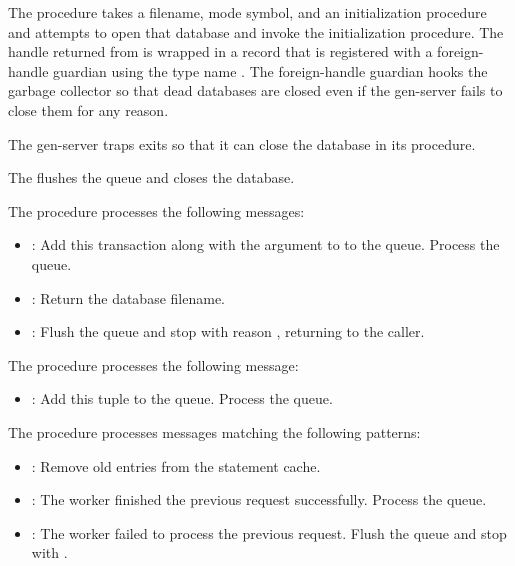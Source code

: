  The  procedure takes a filename, mode
symbol, and an initialization procedure and attempts to open that
database and invoke the initialization procedure.  The handle returned
from  is wrapped in a  record
that is registered with a foreign-handle guardian using the type name
.  The foreign-handle guardian hooks the garbage
collector so that dead databases are closed even if the 
gen-server fails to close them for any reason.

The gen-server traps exits so that it can close the database in its
 procedure.

 The  flushes the queue and
closes the database.

 The  procedure
processes the following messages:

\antipar\begin{itemize}

\item {}: Add this transaction along
  with the  argument to  to the queue.
  Process the queue.

\item {}: Return the database filename.

\item {}: Flush the queue and stop with reason
  , returning  to the caller.

\end{itemize}

 The  procedure
processes the following message:

\antipar\begin{itemize}

\item {}: Add this tuple to the
  queue. Process the queue.

\end{itemize}

 The  procedure
processes messages matching the following patterns:

\antipar\begin{itemize}

\item {}: Remove old entries from the statement cache.

\item {}: The worker finished
  the previous request successfully. Process the queue.

\item {}: The worker
  failed to process the previous request. Flush the queue and stop
  with .

\end{itemize}

